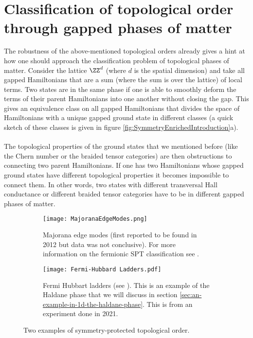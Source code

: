 \section{Classification of topological order through gapped phases of matter}
The robustness of the above-mentioned topological orders already gives a hint at how one should approach the classification problem of topological phases of matter. Consider the lattice $\ZZ^d$ (where $d$ is the spatial dimension) and take all gapped Hamiltonians that are a sum (where the sum is over the lattice) of local terms. Two states are in the same phase if one is able to smoothly deform the terms of their parent Hamiltonians into one another without closing the gap. This gives an equivalence class on all gapped Hamiltonians that divides the space of Hamiltonians with a unique gapped ground state in different classes (a quick sketch of these classes is given in figure \ref{fig:SymmetryEnrichedIntroduction}a).
\\\\
The topological properties of the ground states that we mentioned before (like the Chern number or the braided tensor categories) are then obstructions to connecting two parent Hamiltonians. If one has two Hamiltonians whose gapped ground states have different topological properties it becomes impossible to connect them. In other words, two states with different transversal Hall conductance or different braided tensor categories have to be in different gapped phases of matter.
\begin{figure}
	\begin{subfigure}[b]{0.45\textwidth}
		\centering
		\texttt{[image: MajoranaEdgeModes.png]}
		\caption{Majorana edge modes (first reported to be found in 2012 but data was not conclusive). For more information on the fermionic SPT classification see \cite{Bourne_2021}.}
	\end{subfigure}
	\hfil
	\begin{subfigure}[b]{0.45\textwidth}
		\centering
		\texttt{[image: Fermi-Hubbard Ladders.pdf]}
		\caption{Fermi Hubbart ladders (see \cite{sompet2022realizing}). This is an example of the Haldane phase that we will discuss in section \ref{sec:an-example-in-1d-the-haldane-phase}. This is from an experiment done in 2021.}
	\end{subfigure}
	\caption{Two examples of symmetry-protected topological order.}
	\label{fig:SymmetryProtectedTopologicalOrderFigures}
\end{figure}
